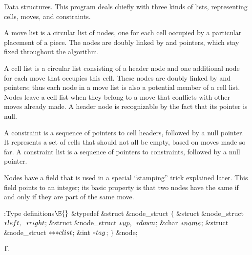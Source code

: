 Data structures. This program deals chiefly with three
kinds of lists,
representing cells, moves, and constraints.

A move list is a circular list of nodes, one for each cell occupied by
a particular placement of a piece. The nodes are doubly linked by
 and  pointers, which stay fixed throughout the
algorithm.

A cell list is a circular list consisting of a header node and one additional
node for each move that occupies this cell. These nodes are doubly linked
by  and  pointers; thus each node in a move list is
also a potential
member of a cell list. Nodes leave a cell list when they belong to a move
that conflicts with other moves already made. A header node is recognizable
by the fact that its  pointer is null.

A constraint is a sequence of pointers to cell headers, followed
by a null pointer. It represents a set of cells that should not all be
empty, based on moves made so far. A constraint list is a sequence of pointers
to constraints, followed by a null pointer.

Nodes have a  field that is used in a special ``stamping'' trick
explained later. This field points to an integer; its basic property is
that two nodes have the same  if and only if they are part
of the same move.

\Y\B\4:Type definitions\X${}\E{}$\6
\&{typedef} \&{struct} \&{node\_struct} ${}\{{}$\1\6
\&{struct} \&{node\_struct} ${}{*}\\{left},{}$ ${}{*}\\{right}{}$;\6
\&{struct} \&{node\_struct} ${}{*}\\{up},{}$ ${}{*}\\{down}{}$;\6
\&{char} ${}{*}\\{name}{}$;\6
\&{struct} \&{node\_struct} ${}{*}{*}{*}\\{clist}{}$;\6
\&{int} ${}{*}\\{tag}{}$;\2\6
${}\}{}$ \&{node};\par
\U1.\fi

